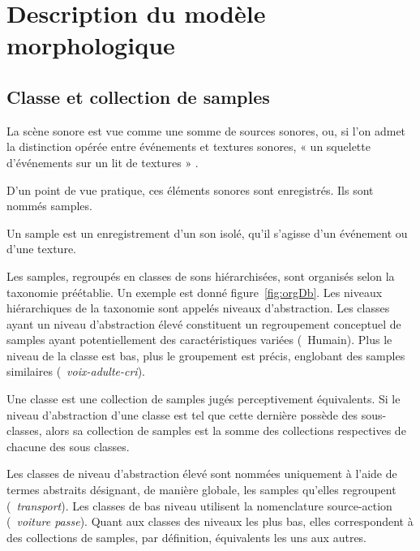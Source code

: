 \section{Description du modèle morphologique}
\label{sec:ch4_modelDes}

\subsection{Classe et collection de samples}
\label{sec:ch4_collecSons}

La scène sonore est vue comme une somme de sources sonores, ou, si l'on admet la distinction opérée entre événements et textures sonores, « un squelette d'événements sur un lit de textures » \citep{nelken2013ear}. 

D'un point de vue pratique, ces éléments sonores sont enregistrés. Ils sont nommés samples.
 
\begin{mydef}
Un sample est un enregistrement d'un son isolé, qu'il s'agisse d'un événement ou d'une texture.
\end{mydef}

Les samples, regroupés en classes de sons hiérarchisées, sont organisés selon la taxonomie préétablie. Un exemple est donné figure~\ref{fig:orgDb}. Les niveaux hiérarchiques de la taxonomie sont appelés niveaux d'abstraction. Les classes ayant un niveau d'abstraction élevé constituent un regroupement conceptuel de samples ayant potentiellement des caractéristiques variées (\eg~{Humain}). Plus le niveau de la classe est bas, plus le groupement est précis, englobant des samples similaires (\eg~\emph{voix-adulte-cri}). 

\begin{mydef}
Une classe est une collection de samples jugés perceptivement équivalents. Si le niveau d'abstraction d'une classe est tel que cette dernière possède des sous-classes, alors sa collection de samples est la somme des collections respectives de chacune des sous classes.
\end{mydef}

Les classes de niveau d'abstraction élevé sont nommées uniquement à l'aide de termes abstraits désignant, de manière globale, les samples qu'elles regroupent (\eg~\emph{transport}). Les classes de bas niveau utilisent la nomenclature source-action (\eg~\emph{voiture passe}). Quant aux classes des niveaux les plus bas, elles correspondent à des collections de samples, par définition, équivalents les uns aux autres.

